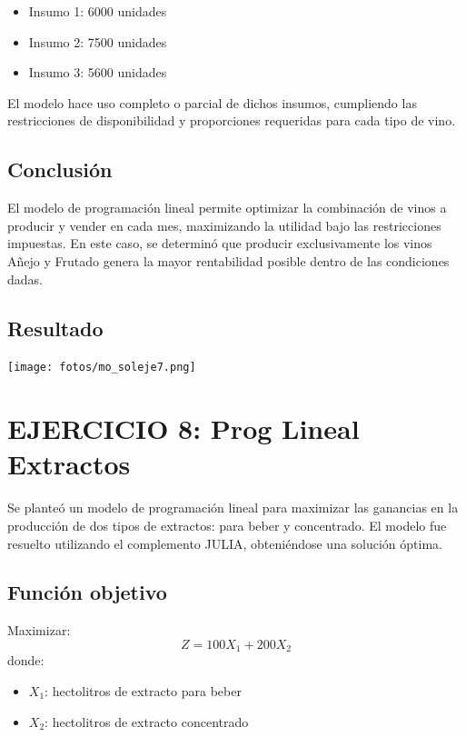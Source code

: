 \documentclass[12pt, a4paper, oneside]{book}
\theoremstyle{definition}
\begin{document}
    \begin{itemize}
        \item Insumo 1: 6000 unidades
        \item Insumo 2: 7500 unidades
        \item Insumo 3: 5600 unidades
    \end{itemize}

    El modelo hace uso completo o parcial de dichos insumos, cumpliendo las restricciones de disponibilidad y proporciones requeridas para cada tipo de vino.

    \subsection{Conclusión}

    El modelo de programación lineal permite optimizar la combinación de vinos a producir y vender en cada mes, maximizando la utilidad bajo las restricciones impuestas. En este caso, se determinó que producir exclusivamente los vinos Añejo y Frutado genera la mayor rentabilidad posible dentro de las condiciones dadas.



    \subsection{Resultado}

    \begin{center}
    \texttt{[image: fotos/mo\_soleje7.png]}
    \end{center}

    \newpage
    \section{EJERCICIO 8: Prog Lineal Extractos}

    Se planteó un modelo de programación lineal para maximizar las ganancias en la producción de dos tipos de extractos: para beber y concentrado. El modelo fue resuelto utilizando el complemento JULIA, obteniéndose una solución óptima.

    \subsection{Función objetivo}
    Maximizar:
    \[
    Z = 100X_1 + 200X_2
    \]
    donde:
    \begin{itemize}
        \item \( X_1 \): hectolitros de extracto para beber
        \item \( X_2 \): hectolitros de extracto concentrado
    \end{itemize}
\end{document}
